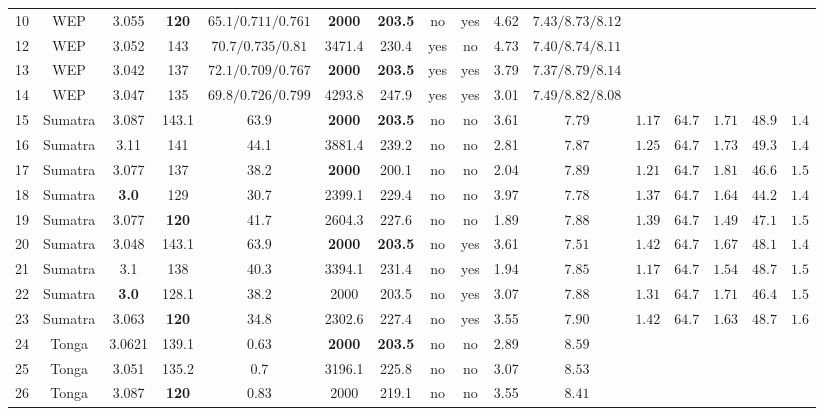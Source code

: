 \documentclass[12pt]{article}
\begin{document}
{\begin{table}
\begin{table}[H]
{\begin{tabular}{c c c c c c c c c c c c c c c c }
         10 &WEP& 3.055 & \textbf{120} & $65.1/0.711/0.761$ & \textbf{2000} & \textbf{203.5} & no  &yes &4.62 &$7.43/8.73/8.12$\\
         12 &WEP& 3.052 & 143 & $70.7/0.735/0.81$ & 3471.4 & 230.4 & yes  &no & 4.73 &$7.40/8.74/8.11$ \\
         13 &WEP& 3.042 & 137 & $72.1/0.709/0.767$ & \textbf{2000} & \textbf{203.5} & yes  &yes & 3.79 &$7.37/8.79/8.14$ \\
         14 &WEP& 3.047 & 135 & $69.8/0.726/0.799$ & 4293.8 & 247.9 & yes  &yes &3.01 &$7.49/8.82/8.08$ \\
         15 &Sumatra& 3.087 & 143.1 & $63.9$ &  \textbf{2000}& \textbf{203.5}& no &no &3.61 & $7.79$  & $1.17$ & $64.7$ & $1.71$ & $48.9$ & $1.4$  \\
         16 &Sumatra& 3.11 & 141 & 44.1 & 3881.4 & 239.2   &no &no &2.81 & $7.87$ & $1.25$ & $64.7$ & $1.73$ & $49.3$ & $1.4$\\
         17 &Sumatra& 3.077 & 137 & 38.2 & \textbf{2000} & 200.1   &no &no &2.04 &$7.89$ & $1.21$ & $64.7$ & $1.81$ & $46.6$ & $1.5$\\ 
         18 &Sumatra& \textbf{3.0} & 129 & 30.7 & 2399.1 & 229.4   &no &no &3.97 &$7.78$&  $1.37$ & $64.7$ & $1.64$ & $44.2$ & $1.4$ \\
         19 &Sumatra& 3.077 & \textbf{120} & 41.7 & 2604.3 & 227.6   &no &no &1.89 &$7.88$ & $1.39$ & $64.7$ & $1.49$ & $47.1$ & $1.5$  \\
         20 &Sumatra& 3.048 & 143.1 & $63.9$ &  \textbf{2000}& \textbf{203.5}& no &yes &3.61 &$7.51$ & $1.42$ & $64.7$ & $1.67$ & $48.1$ & $1.4$   \\
         21 &Sumatra& 3.1 & 138 & 40.3 & 3394.1 & 231.4   &no &yes &1.94 &$7.85$ & $1.17$ & $64.7$ & $1.54$ & $48.7$ & $1.5$  \\
         22 &Sumatra& \textbf{3.0} & 128.1 & 38.2 & 2000 & 203.5   &no &yes &3.07 &$7.88$ & $1.31$ & $64.7$ & $1.71$ & $46.4$ & $1.5$ \\
         23  &Sumatra& 3.063 & \textbf{120} & 34.8 & 2302.6& 227.4   &no &yes &3.55 & $7.90$ & $1.42$ & $64.7$ & $1.63$ & $48.7$ & $1.6$\\
         24&Tonga  & 3.0621 & 139.1 & 0.63 & \textbf{2000} & \textbf{203.5} &no &no &2.89 & $8.59$ \\             
         25 &Tonga  & 3.051 & 135.2 & 0.7& 3196.1 & 225.8 &no &no &3.07& $8.53$ \\             
          26 &Tonga  & 3.087 &  \textbf{120} & 0.83 & 2000 &219.1  &no &no &3.55 & $8.41$\\              

\end{tabular}}
\end{table}
\end{table}}
\end{document}
